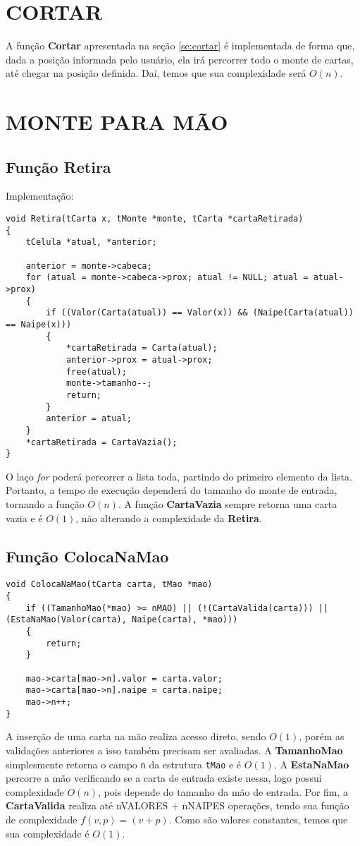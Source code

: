 \documentclass[12pt, oneside, a4paper, brazil]{abntex2}
\begin{document}
\section{CORTAR}

A função \textbf{Cortar} apresentada na seção \ref{se:cortar} é implementada de forma que, dada a posição informada pelo usuário, ela irá percorrer todo o monte de cartas, até chegar na posição definida. Daí, temos que sua complexidade será $O(n)$.

\section{MONTE PARA MÃO}
\subsection{Função Retira}
Implementação:
\begin{lstlisting}
void Retira(tCarta x, tMonte *monte, tCarta *cartaRetirada)
{
    tCelula *atual, *anterior;

    anterior = monte->cabeca;
    for (atual = monte->cabeca->prox; atual != NULL; atual = atual->prox)
    {
        if ((Valor(Carta(atual)) == Valor(x)) && (Naipe(Carta(atual)) == Naipe(x)))
        {
            *cartaRetirada = Carta(atual);
            anterior->prox = atual->prox;
            free(atual);
            monte->tamanho--;
            return;
        }
        anterior = atual;
    }
    *cartaRetirada = CartaVazia();
}
\end{lstlisting}

O laço \textit{for} poderá percorrer a lista toda, partindo do primeiro elemento da lista. Portanto, a tempo de execução dependerá do tamanho do monte de entrada, tornando a função $O(n)$. A função \textbf{CartaVazia} sempre retorna uma carta vazia e é $O(1)$, não alterando a complexidade da \textbf{Retira}.

\subsection{Função ColocaNaMao}
\begin{lstlisting}
void ColocaNaMao(tCarta carta, tMao *mao)
{
    if ((TamanhoMao(*mao) >= nMAO) || (!(CartaValida(carta))) || (EstaNaMao(Valor(carta), Naipe(carta), *mao)))
    {
        return;
    }

    mao->carta[mao->n].valor = carta.valor;
    mao->carta[mao->n].naipe = carta.naipe;
    mao->n++;
}
\end{lstlisting}
A inserção de uma carta na mão realiza acesso direto, sendo $O(1)$, porém as validações anteriores a isso também precisam ser avaliadas. A \textbf{TamanhoMao} simplesmente retorna o campo \texttt{n} da estrutura \texttt{tMao} e é $O(1)$. A \textbf{EstaNaMao} percorre a mão verificando se a carta de entrada existe nessa, logo possui complexidade $O(n)$, pois depende do tamanho da mão de entrada. Por fim, a \textbf{CartaValida} realiza até nVALORES + nNAIPES operações, tendo sua função de complexidade $f(v, p) = (v + p)$. Como são valores constantes, temos que sua complexidade é $O(1)$.
\end{document}
